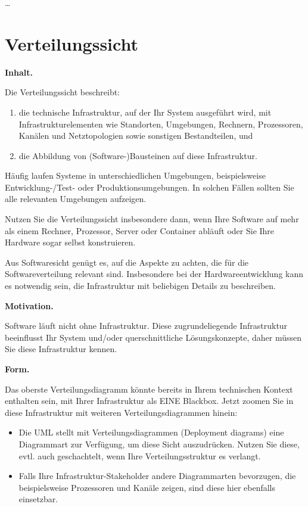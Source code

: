 \documentclass[]{article}
\begin{document}
\ldots{}

\hypertarget{section-deployment-view}{%
\section{Verteilungssicht}\label{section-deployment-view}}

\textbf{Inhalt.}

Die Verteilungssicht beschreibt:

\begin{enumerate}
\def\labelenumi{\arabic{enumi}.}
\item
  die technische Infrastruktur, auf der Ihr System ausgeführt wird, mit
  Infrastrukturelementen wie Standorten, Umgebungen, Rechnern,
  Prozessoren, Kanälen und Netztopologien sowie sonstigen Bestandteilen,
  und
\item
  die Abbildung von (Software-)Bausteinen auf diese Infrastruktur.
\end{enumerate}

Häufig laufen Systeme in unterschiedlichen Umgebungen, beispielsweise
Entwicklung-/Test- oder Produktionsumgebungen. In solchen Fällen sollten
Sie alle relevanten Umgebungen aufzeigen.

Nutzen Sie die Verteilungssicht insbesondere dann, wenn Ihre Software
auf mehr als einem Rechner, Prozessor, Server oder Container abläuft
oder Sie Ihre Hardware sogar selbst konstruieren.

Aus Softwaresicht genügt es, auf die Aspekte zu achten, die für die
Softwareverteilung relevant sind. Insbesondere bei der
Hardwareentwicklung kann es notwendig sein, die Infrastruktur mit
beliebigen Details zu beschreiben.

\textbf{Motivation.}

Software läuft nicht ohne Infrastruktur. Diese zugrundeliegende
Infrastruktur beeinflusst Ihr System und/oder querschnittliche
Lösungskonzepte, daher müssen Sie diese Infrastruktur kennen.

\textbf{Form.}

Das oberste Verteilungsdiagramm könnte bereits in Ihrem technischen
Kontext enthalten sein, mit Ihrer Infrastruktur als EINE Blackbox. Jetzt
zoomen Sie in diese Infrastruktur mit weiteren Verteilungsdiagrammen
hinein:

\begin{itemize}
\item
  Die UML stellt mit Verteilungsdiagrammen (Deployment diagrams) eine
  Diagrammart zur Verfügung, um diese Sicht auszudrücken. Nutzen Sie
  diese, evtl. auch geschachtelt, wenn Ihre Verteilungsstruktur es
  verlangt.
\item
  Falls Ihre Infrastruktur-Stakeholder andere Diagrammarten bevorzugen,
  die beispielsweise Prozessoren und Kanäle zeigen, sind diese hier
  ebenfalls einsetzbar.
\end{itemize}
\end{document}
